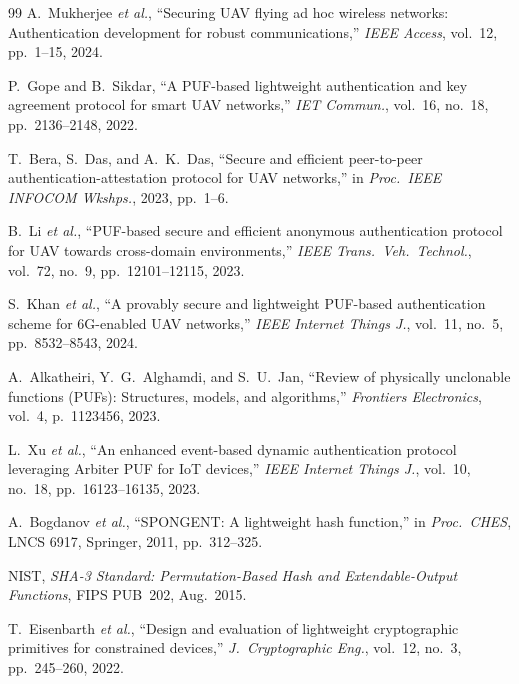 \documentclass[conference,a4paper,10pt]{IEEEtran}
\begin{document}
\balance
\begin{thebibliography}{99}
 A.~Mukherjee \textit{et al.},
``Securing UAV flying ad hoc wireless networks: Authentication
development for robust communications,'' \emph{IEEE Access},
vol.~12, pp.~1--15, 2024.

 P.~Gope and B.~Sikdar, ``A PUF-based
lightweight authentication and key agreement protocol for smart UAV
networks,'' \emph{IET Commun.}, vol.~16, no.~18, pp.~2136--2148,
2022.

 T.~Bera, S.~Das, and A.~K.~Das,
``Secure and efficient peer-to-peer authentication-attestation
protocol for UAV networks,'' in \emph{Proc.\ IEEE INFOCOM Wkshps.},
2023, pp.~1--6.

 B.~Li \textit{et al.}, ``PUF-based
secure and efficient anonymous authentication protocol for UAV
towards cross-domain environments,'' \emph{IEEE Trans.\ Veh.\
Technol.}, vol.~72, no.~9, pp.~12101--12115, 2023.

 S.~Khan \textit{et al.}, ``A provably secure
and lightweight PUF-based authentication scheme for 6G-enabled UAV
networks,'' \emph{IEEE Internet Things J.}, vol.~11, no.~5,
pp.~8532--8543, 2024.

 A.~Alkatheiri, Y.~G.~Alghamdi, and
S.~U.~Jan, ``Review of physically unclonable functions (PUFs):
Structures, models, and algorithms,'' \emph{Frontiers Electronics},
vol.~4, p.~1123456, 2023.

 L.~Xu \textit{et al.}, ``An enhanced
event-based dynamic authentication protocol leveraging Arbiter PUF
for IoT devices,'' \emph{IEEE Internet Things J.}, vol.~10, no.~18,
pp.~16123--16135, 2023.

 A.~Bogdanov \textit{et al.},
``SPONGENT: A lightweight hash function,'' in \emph{Proc.\ CHES},
LNCS 6917, Springer, 2011, pp.~312--325.

 NIST, \emph{SHA-3 Standard:
Permutation-Based Hash and Extendable-Output Functions},
FIPS PUB~202, Aug.~2015.

 T.~Eisenbarth \textit{et
al.}, ``Design and evaluation of lightweight cryptographic
primitives for constrained devices,'' \emph{J.\ Cryptographic
Eng.}, vol.~12, no.~3, pp.~245--260, 2022.


\end{thebibliography}
\end{document}
